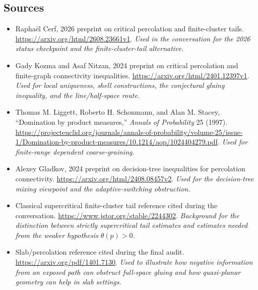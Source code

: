 \documentclass[11pt]{article}
\begin{document}
\subsection{Sources}
\begin{itemize}
\item[S1] Rapha\"el Cerf, 2026 preprint on critical percolation and finite-cluster tails.
\url{https://arxiv.org/html/2608.23661v1}.
\textit{Used in the conversation for the 2026 status checkpoint and the finite-cluster-tail alternative.}

\item[S2] Gady Kozma and Asaf Nitzan, 2024 preprint on critical percolation and finite-graph connectivity inequalities.
\url{https://arxiv.org/html/2401.12397v1}.
\textit{Used for local uniqueness, shell constructions, the conjectural gluing inequality, and the line/half-space route.}

\item[S3] Thomas M. Liggett, Roberto H. Schonmann, and Alan M. Stacey, ``Domination by product measures,'' \emph{Annals of Probability} 25 (1997).
\url{https://projecteuclid.org/journals/annals-of-probability/volume-25/issue-1/Domination-by-product-measures/10.1214/aop/1024404279.pdf}.
\textit{Used for finite-range dependent coarse-graining.}

\item[S4] Alexey Gladkov, 2024 preprint on decision-tree inequalities for percolation connectivity.
\url{https://arxiv.org/html/2408.08457v2}.
\textit{Used for the decision-tree mixing viewpoint and the adaptive-switching obstruction.}

\item[S5] Classical supercritical finite-cluster tail reference cited during the conversation.
\url{https://www.jstor.org/stable/2244302}.
\textit{Background for the distinction between strictly supercritical tail estimates and estimates needed from the weaker hypothesis \(\theta(p)>0\).}

\item[S6] Slab/percolation reference cited during the final audit.
\url{https://arxiv.org/pdf/1401.7130}.
\textit{Used to illustrate how negative information from an exposed path can obstruct full-space gluing and how quasi-planar geometry can help in slab settings.}
\end{itemize}
\end{document}
